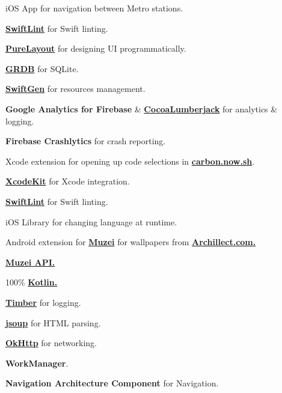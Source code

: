 \documentclass[]{Resume}
\begin{document}
\begin{minipage}[t]{0.66\textwidth}
iOS App for navigation between Metro stations.
\begin{tightemize}
\item \textbf{\href{http://github.com/realm/SwiftLint}{SwiftLint}} for Swift linting.
\item \textbf{\href{http://github.com/PureLayout/PureLayout}{PureLayout}} for designing UI programmatically.
\item \textbf{\href{http://github.com/groue/GRDB.swift}{GRDB}} for SQLite.
\item \textbf{\href{http://github.com/SwiftGen/SwiftGen}{SwiftGen}} for resources management.
\item \textbf{Google Analytics for Firebase} \& \textbf{\href{http://github.com/CocoaLumberjack/CocoaLumberjack}{CocoaLumberjack}} for analytics \& logging.
\item \textbf{Firebase Crashlytics} for crash reporting.
\end{tightemize}
\sectionsep

Xcode extension for opening up code selections in  \textbf{\href{http://carbon.now.sh/}{carbon.now.sh}}.
\begin{tightemize}
\item \textbf{\href{http://developer.apple.com/documentation/xcodekit}{XcodeKit}} for Xcode integration.
\item \textbf{\href{http://github.com/realm/SwiftLint}{SwiftLint}} for Swift linting.
\end{tightemize}
\sectionsep

iOS Library for changing language at runtime.
\sectionsep

Android extension for \textbf{\href{http://muzei.co}{Muzei}} for wallpapers from \textbf{\href{http://Archillect.com}{Archillect.com.}}
\begin{tightemize}
\item \textbf{\href{http://api.muzei.co}{Muzei API.}}
\item 100\% \textbf{\href{http://kotlinlang.org}{Kotlin.}}
\item \textbf{\href{http://github.com/JakeWharton/timber}{Timber}} for logging.
\item \textbf{\href{http://jsoup.org}{jsoup}} for HTML parsing.
\item \textbf{\href{http://square.github.io/okhttp}{OkHttp}} for networking.
\item \textbf{WorkManager}.
\item \textbf{Navigation Architecture Component} for Navigation.
\end{tightemize}
\sectionsep

\end{minipage} 
\end{document}
